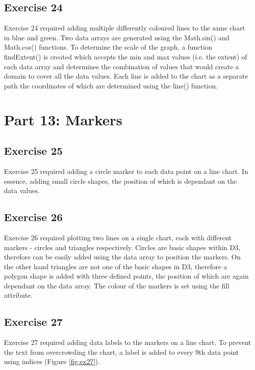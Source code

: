 \documentclass[11pt]{article}   	%
\begin{document}
\subsection{ Exercise 24 }
\vspace{-1em}
Exercise 24 required adding multiple differently coloured lines to the same chart in blue and green. Two data arrays are generated using the Math.sin() and Math.cos() functions. To determine the scale of the graph, a function findExtent() is created which accepts the min and max values (i.e. the extent) of each data array and determines the combination of values that would create a domain to cover all the data values. Each line is added to the chart as a separate path the coordinates of which are determined using the line() function. 

\section{Part 13: Markers}
\subsection{Exercise 25 }
\vspace{-1em}
Exercise 25 required adding a circle marker to each data point on a line chart. In essence, adding small circle shapes, the position of which is dependant on the data values. 


\subsection{ Exercise 26 }
\vspace{-1em}
Exercise 26 required plotting two lines on a single chart, each with different markers - circles and triangles respectively. Circles are basic shapes within D3, therefore can be easily added using the data array to position the markers. On the other hand triangles are not one of the basic shapes in D3, therefore a polygon shape is added with three defined points, the position of which are again dependant on the data array. The colour of the markers is set using the fill attribute.



\subsection{Exercise 27 }
\vspace{-1em}
Exercise 27 required adding data labels to the markers on a line chart. To prevent the text from overcrowding the chart, a label is added to every 9th data point using indices (Figure \ref{fig:ex27}). 
\end{document}
